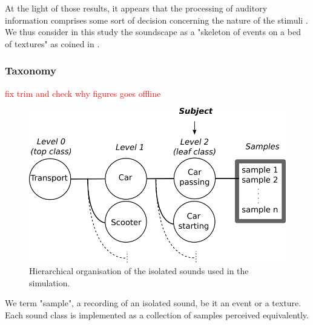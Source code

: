 \documentclass[preprint,12pt]{elsarticle}
\newcommand{\ml}[1]{\textcolor{red}{#1}}
\newcommand{\ie}{\emph{i.\,e.}}
\newcommand{\cf}{cf.}
\newcommand{\myfloatalign}{\centering}
\begin{document}
At the light of those results, it appears that the processing of auditory information comprises some sort of decision concerning the nature of the stimuli \cite{nelken2013ear,mcdermott2013summary}. We thus consider in this study the soundscape as a "skeleton of events on a bed of textures" as coined in \cite{nelken2013ear}.

\subsubsection*{Taxonomy}

\ml{fix trim and check why figures goes offline}

\begin{figure}[t]
        \myfloatalign
        \includegraphics[trim={5cm 0 0 0},clip,width=.8\linewidth]{gfx/ch_4/3.png}
       \caption{Hierarchical organisation of the isolated sounds used in the simulation.}\label{fig:orgDb}
\end{figure}


We term "sample", a recording of an isolated sound, be it an event or a texture. Each sound class is implemented as a collection of samples perceived equivalently.

\end{document}
